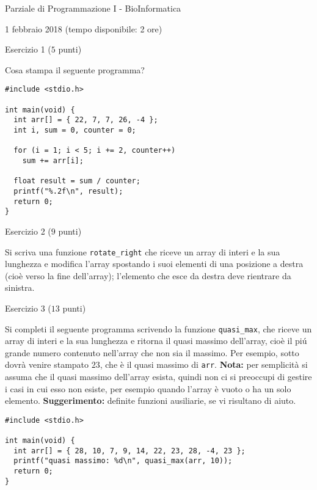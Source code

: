 \documentclass[12pt]{article}
\begin{document}
\begin{center}{\LARGE Parziale di Programmazione I - BioInformatica}\\
\vspace*{-2ex}
\begin{center}
  \large 1 febbraio 2018 (tempo disponibile: 2 ore)
\end{center}
\end{center}

\begin{center}{\Large Esercizio 1} ($5$ punti)
\end{center}

Cosa stampa il seguente programma?

\begin{lstlisting}
#include <stdio.h>

int main(void) {
  int arr[] = { 22, 7, 7, 26, -4 };
  int i, sum = 0, counter = 0;

  for (i = 1; i < 5; i += 2, counter++)
    sum += arr[i];

  float result = sum / counter;
  printf("%.2f\n", result);
  return 0;
}
\end{lstlisting}

\vspace*{1ex}
\begin{center}{\Large Esercizio 2} ($9$ punti)
\end{center}
Si scriva una funzione \texttt{rotate\_right} che riceve un array di interi e la sua lunghezza e modifica l'array spostando i suoi elementi di una posizione a destra (cio\`e verso la fine dell'array); l'elemento che esce da destra deve rientrare da sinistra.

\vspace*{1ex}
\begin{center}{\Large Esercizio 3} ($13$ punti)\end{center}
%
Si completi il seguente programma scrivendo la funzione
\texttt{quasi\_max}, che riceve un array di interi e la sua lunghezza
e ritorna il quasi massimo dell'array, cio\`e il pi\'u grande numero
contenuto nell'array che non sia il massimo. Per esempio, sotto
dovr\`a venire stampato $23$, che \`e il quasi massimo di \texttt{arr}.
\textbf{Nota:} per semplicit\`a
si assuma che il quasi massimo dell'array
esista, quindi non ci si preoccupi di gestire i casi in cui
esso non esiste, per esempio quando l'array \`e vuoto
o ha un solo elemento. \textbf{Suggerimento:} definite funzioni
ausiliarie, se vi risultano di aiuto.
%
\begin{lstlisting}
#include <stdio.h>

int main(void) {
  int arr[] = { 28, 10, 7, 9, 14, 22, 23, 28, -4, 23 };
  printf("quasi massimo: %d\n", quasi_max(arr, 10));
  return 0;
}
\end{lstlisting}
\end{document}
